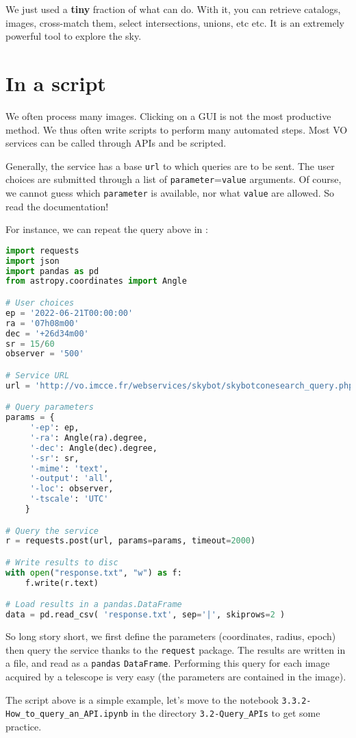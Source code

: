   We just used a \textbf{tiny} fraction of what \aladin can do.
  With it, you can retrieve catalogs, images, cross-match them,
  select intersections, unions, etc etc. It is an extremely powerful
  tool to explore the sky.




\section{In a script}

We often process many images. Clicking on a GUI is not the most
productive method. We thus often write scripts to perform
many automated steps. Most VO services can be called through APIs
and be scripted.

Generally, the service has a base \texttt{url} to which queries are
to be sent. The user choices are submitted through a list of \texttt{parameter}=\texttt{value}
arguments. Of course, we cannot guess which \texttt{parameter} is
available, nor what \texttt{value} are allowed. So read the documentation!

For instance, we can repeat the query above in \python:

\begin{lstlisting}[language=python]
import requests
import json
import pandas as pd
from astropy.coordinates import Angle

# User choices
ep = '2022-06-21T00:00:00'
ra = '07h08m00'
dec = '+26d34m00'
sr = 15/60
observer = '500'

# Service URL
url = 'http://vo.imcce.fr/webservices/skybot/skybotconesearch_query.php?'

# Query parameters
params = {
     '-ep': ep,
     '-ra': Angle(ra).degree,
     '-dec': Angle(dec).degree,
     '-sr': sr,
     '-mime': 'text',
     '-output': 'all',
     '-loc': observer, 
     '-tscale': 'UTC'
    }

# Query the service
r = requests.post(url, params=params, timeout=2000)

# Write results to disc
with open("response.txt", "w") as f:
    f.write(r.text)

# Load results in a pandas.DataFrame
data = pd.read_csv( 'response.txt', sep='|', skiprows=2 )
\end{lstlisting}

  So long story short, we first
  define the parameters (coordinates, radius, epoch) then query the
  \skybot service thanks to the \texttt{request} package. The results
  are written in a file, and read as a \texttt{pandas} \texttt{DataFrame}.
  Performing this query for each image acquired by a telescope is very easy
  (the parameters are contained in the image).

The script above is a simple example, let's move to the notebook
\texttt{3.3.2-How\_to\_query\_an\_API.ipynb} in the directory 
\texttt{3.2-Query\_APIs} to get some practice.


